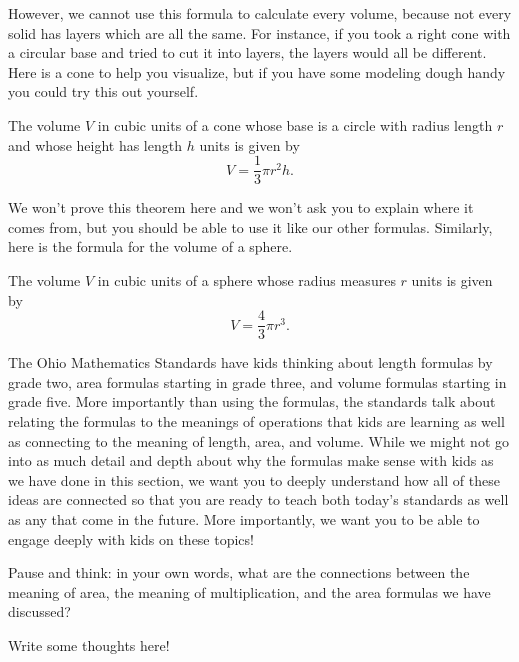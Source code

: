 \documentclass{ximera}
\begin{document}
However, we cannot use this formula to calculate every volume, because not every solid has layers which are all the same. For instance, if you took a right cone with a circular base and tried to cut it into layers, the layers would all be different. Here is a cone to help you visualize, but if you have some modeling dough handy you could try this out yourself.
\begin{image}
\end{image}
\begin{theorem}
The volume $V$ in cubic units of a cone whose base is a circle with radius length $r$ and whose height has length $h$ units is given by
\[
V = \frac13 \pi r^2 h.
\]
\end{theorem}
We won't prove this theorem here and we won't ask you to explain where it comes from, but you should be able to use it like our other formulas. Similarly, here is the formula for the volume of a sphere.
\begin{theorem}
The volume $V$ in cubic units of a sphere whose radius measures $r$ units is given by
\[
V = \frac43 \pi r^3.
\]
\end{theorem}

The Ohio Mathematics Standards have kids thinking about length formulas by grade two, area formulas starting in grade three, and volume formulas starting in grade five. More importantly than using the formulas, the standards talk about relating the formulas to the meanings of operations that kids are learning as well as connecting to the meaning of length, area, and volume. While we might not go into as much detail and depth about why the formulas make sense with kids as we have done in this section, we want you to deeply understand how all of these ideas are connected so that you are ready to teach both today's standards as well as any that come in the future. More importantly, we want you to be able to engage deeply with kids on these topics!

\begin{question}
Pause and think: in your own words, what are the connections between the meaning of area, the meaning of multiplication, and the area formulas we have discussed?
\begin{freeResponse}
Write some thoughts here!
\end{freeResponse}
\end{question}
\end{document}
